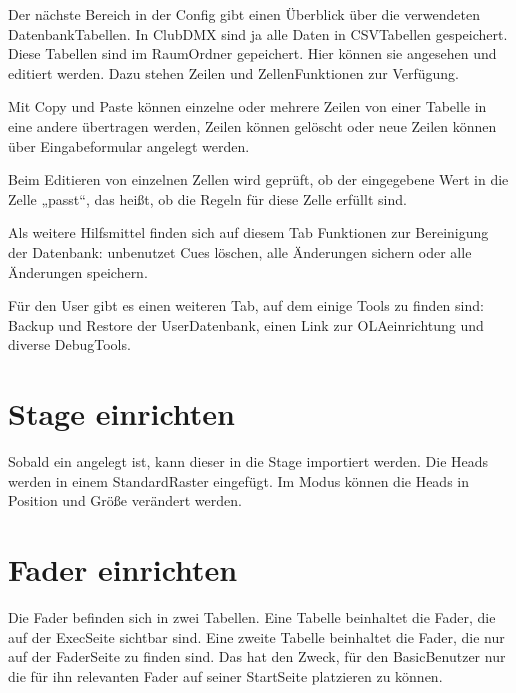 \documentclass[letterpaper,10pt,ngerman]{sphinxmanual}
\begin{document}
\noindent{}

Der nächste Bereich in der Config gibt einen Überblick über die
verwendeten Datenbank\sphinxhyphen{}Tabellen. In ClubDMX sind ja alle Daten in
CSV\sphinxhyphen{}Tabellen gespeichert. Diese Tabellen sind im Raum\sphinxhyphen{}Ordner gepeichert.
Hier können sie angesehen und editiert werden. Dazu stehen Zeilen\sphinxhyphen{} und
Zellen\sphinxhyphen{}Funktionen zur Verfügung.

Mit Copy und Paste können einzelne oder mehrere Zeilen von einer Tabelle
in eine andere übertragen werden, Zeilen können gelöscht oder neue Zeilen
können über Eingabeformular angelegt werden.

Beim Editieren von einzelnen Zellen wird geprüft, ob der eingegebene Wert
in die Zelle „passt“, das heißt, ob die Regeln für diese Zelle erfüllt
sind.

Als weitere Hilfsmittel finden sich auf diesem Tab Funktionen zur
Bereinigung der Datenbank: unbenutzet Cues löschen, alle Änderungen sichern
oder alle Änderungen speichern.

\noindent{}

Für den User  gibt es einen weiteren Tab, auf dem einige Tools zu
finden sind: Backup und Restore der User\sphinxhyphen{}Datenbank, einen Link zur
OLA\sphinxhyphen{}einrichtung und diverse Debug\sphinxhyphen{}Tools.


\section{Stage einrichten}
\label{\detokenize{einrichten:stage-einrichten}}\label{\detokenize{einrichten:stage}}
Sobald ein {\hyperref[\detokenize{patch:patchlabel}]{}} angelegt ist, kann dieser in die
Stage importiert werden. Die Heads werden in einem Standard\sphinxhyphen{}Raster eingefügt.
Im Modus  können die Heads in Position und Größe verändert
werden.

\noindent{}


\section{Fader einrichten}
\label{\detokenize{einrichten:fader-einrichten}}\label{\detokenize{einrichten:fader}}
Die Fader befinden sich in zwei Tabellen. Eine Tabelle beinhaltet die Fader, die
auf der Exec\sphinxhyphen{}Seite sichtbar sind.
Eine zweite Tabelle beinhaltet die Fader, die
nur auf der Fader\sphinxhyphen{}Seite zu finden sind. Das hat den Zweck, für den
Basic\sphinxhyphen{}Benutzer nur die für ihn relevanten Fader auf seiner Start\sphinxhyphen{}Seite
platzieren zu können.
\end{document}
